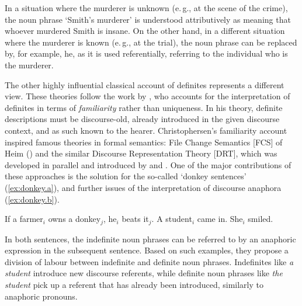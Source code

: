 \documentclass[output=paper]{langsci/langscibook}
\begin{document}
In a situation where the murderer is unknown (e.\,g., at the scene of the crime), the noun phrase `Smith's murderer' is understood attributively as meaning that whoever murdered Smith is insane. On the other hand, in a different situation where the murderer is known (e.\,g., at the trial), the noun phrase can be replaced by, for example, he, as it is used referentially, referring to the individual who is the murderer.

{
The other highly influential classical account of definites represents a different view. These theories follow the work by \citet{christophersen:39}, who accounts for the interpretation of definites in terms of {\emph{familiarity}} rather than uniqueness. In his theory, definite descriptions must be discourse-old, already introduced in the given discourse context, and as such known to the hearer. Christophersen's familiarity account inspired famous theories in formal semantics: File Change Semantics [FCS] of Heim (\citeyear{heim:82}) and the similar Discourse Representation Theory [DRT], which was developed in parallel and introduced by \citet{kamp:81} and \citet{drt:93}. One of the major contributions of these approaches is the solution for the so-called `donkey sentences' (\ref{ex:donkey.a}), and further issues of the interpretation of discourse anaphora (\ref{ex:donkey.b}). 
}

\begin{exe}
\ex
	\begin{xlista}
	\ex\label{ex:donkey.a}
	If a farmer$_i$ owns a donkey$_j$, he$_i$ beats it$_j$.
	\ex\label{ex:donkey.b}
	A student$_i$ came in. She$_i$ smiled.
	\end{xlista}
\end{exe}

In both sentences, the indefinite noun phrases can be referred to by an anaphoric expression in the subsequent sentence. Based on such examples, they propose a division of labour between indefinite and definite noun phrases. Indefinites like {\emph{a student}} introduce new discourse referents, while definite noun phrases like {\emph{the student}} pick up a referent that has already been introduced, similarly to anaphoric pronouns.
\end{document}
